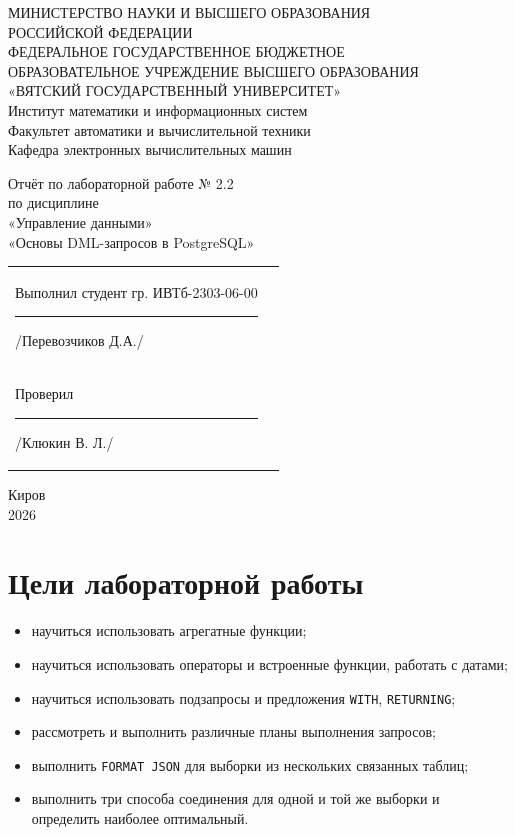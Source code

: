 \documentclass[oneside,a4paper,14pt]{extarticle}
\begin{document}
\newpage\thispagestyle{empty}

\begin{center}
МИНИСТЕРСТВО НАУКИ И ВЫСШЕГО ОБРАЗОВАНИЯ\\
РОССИЙСКОЙ ФЕДЕРАЦИИ\\
ФЕДЕРАЛЬНОЕ ГОСУДАРСТВЕННОЕ БЮДЖЕТНОЕ\\
ОБРАЗОВАТЕЛЬНОЕ УЧРЕЖДЕНИЕ ВЫСШЕГО ОБРАЗОВАНИЯ\\
«ВЯТСКИЙ ГОСУДАРСТВЕННЫЙ УНИВЕРСИТЕТ»\\
Институт математики и информационных систем\\
Факультет автоматики и вычислительной техники\\
Кафедра электронных вычислительных машин
\end{center}

\vspace{30mm}

\begin{center}
Отчёт по лабораторной работе № 2.2\\
по дисциплине\\
«Управление данными»\\
«Основы DML-запросов в PostgreSQL»
\end{center}

\vspace{40mm}

\noindent
\begin{tabular}{l r}
Выполнил студент гр. ИВТб-2303-06-00 \hspace{3mm}\rule[-1mm]{20mm}{0.15mm} /Перевозчиков Д.А./ \\

Проверил \hspace{57mm}\rule[-1mm]{20mm}{0.15mm} /Клюкин В. Л./
\end{tabular}

\vfill
\begin{center}
Киров\\
2026
\end{center}


\newpage\thispagestyle{empty}

\section{Цели лабораторной работы}

\begin{itemize}
    \item научиться использовать агрегатные функции;
    \item научиться использовать операторы и встроенные функции, работать с датами;
    \item научиться использовать подзапросы и предложения \texttt{WITH}, \texttt{RETURNING};
    \item рассмотреть и выполнить различные планы выполнения запросов;
    \item выполнить \texttt{FORMAT JSON} для выборки из нескольких связанных таблиц;
    \item выполнить три способа соединения для одной и той же выборки и определить наиболее оптимальный.
\end{itemize}
\end{document}
